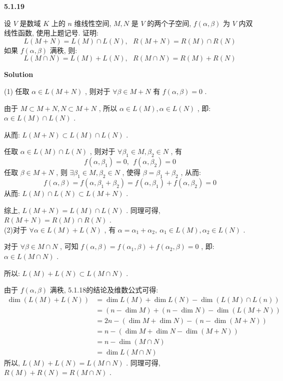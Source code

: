 \documentclass[11pt,a4paper,openany,oneside]{book}
\newcommand\Solution{\noindent\textbf{\textsf{Solution}}\par\medskip}
\begin{document}
\begin{myexample}
	\textbf{5.1.19}

设 $ V $ 是数域 $ K $ 上的 $ n $ 维线性空间,  $ M, N $ 是 $ V $ 的两个子空间,  $ f(\alpha, \beta) $ 为 $ V $ 内双线性函数, 使用上题记号. 证明:
 $$  L(M+N) = L(M) \cap L(N), \ \ \ R(M+N) = R(M) \cap R(N)  $$ 
如果 $ f(\alpha, \beta) $ 满秩, 则:
 $$  L(M \cap N) = L(M) + L(N), \ \ \ R(M \cap N) = R(M) + R(N)  $$   

\end{myexample}
\Solution  

(1) 任取 $ \alpha \in L(M+N) $ , 则对于 $ \forall \beta \in M+N $ 有 $ f(\alpha, \beta) = 0 $ .

由于 $ M \subset M+N, N \subset M+N $ , 所以 $ \alpha \in L(M), \alpha \in L(N) $ , 即:  $ \alpha \in L(M) \cap L(N) $ .

从而:  $ L(M + N) \subset L(M) \cap L(N) $ .

任取 $ \alpha \in L(M) \cap L(N) $ , 则对于 $ \forall \beta_1 \in M, \beta_2 \in N $ , 有
 $$  f(\alpha, \beta_1) = 0, \ \ f(\alpha, \beta_2) = 0  $$ 
任取 $ \beta \in M+N $ , 则 $ \exists \beta_1 \in M, \beta_2 \in N $ , 使得 $ \beta = \beta_1+\beta_2 $ , 从而:
 $$  f(\alpha, \beta) = f(\alpha, \beta_1+ \beta_2) = f(\alpha, \beta_1) + f(\alpha, \beta_2) = 0  $$ 
从而:  $ L(M) \cap L(N) \subset L(M + N) $ .

综上,  $ L(M + N ) = L(M) \cap L(N) $ . 同理可得,  $ R(M+N) = R(M) \cap R(N) $ . \\

(2)对于 $ \forall \alpha \in L(M) +L(N) $ , 有 $ \alpha = \alpha_1 + \alpha_2, \ \alpha_1 \in L(M), \alpha_2 \in L(N) $ .

对于 $ \forall \beta \in M \cap N $ , 可知 $ f(\alpha, \beta) = f(\alpha_1, \beta) + f(\alpha_2, \beta) = 0 $ , 即:  $  \alpha \in L(M \cap N) $ .

所以: $ L(M) + L(N) \subset L(M \cap N) $ .

由于 $ f(\alpha, \beta) $ 满秩, 5.1.18的结论及维数公式可得:
\begin{align*}
\dim (L(M) + L(N)) &= \dim L(M) + \dim L(N) - \dim (L(M) \cap L(n))  \\
&=(n - \dim M) + (n - \dim N) - \dim (L(M + N))  \\
&= 2n - (\dim M + \dim N) - (n - \dim (M+N))  \\
&= n - (\dim M + \dim N - \dim (M+N)) \\
&= n -\dim (M \cap N) \\ 
&= \dim L(M \cap N)
\end{align*}
所以,  $ L(M) + L(N) = L(M \cap N) $ . 同理可得,  $ R(M) + R(N) = R(M \cap N) $ . \\ \\  \\
\end{document}
